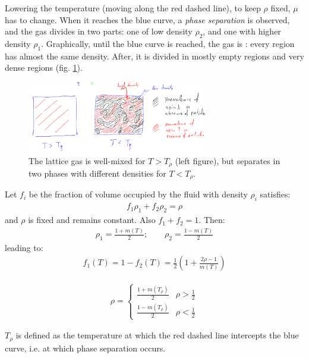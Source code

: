 \documentclass[../template.tex]{subfiles}
\begin{document}
Lowering the temperature (moving along the red dashed line), to keep $\rho$ fixed, $\mu$ has to change. When it reaches the blue curve, a \textit{phase separation} is observed, and the gas divides in two parts: one of low density $\rho_2$, and one with higher density $\rho_1$. Graphically, until the blue curve is reached, the gas is : every region has almost the same density. After, it is divided in mostly empty regions and very dense regions (fig. \ref{fig:fluid-sep}).

\begin{figure}[H]
    \centering
    \includegraphics[width=0.7\textwidth]{image022.png}
    \caption{The lattice gas is well-mixed for $T > T_\rho$ (left figure), but separates in two phases with different densities for $T < T_\rho$.\label{fig:fluid-sep}}
\end{figure}

Let $f_i$ be the fraction of volume occupied by the fluid with density $\rho_i$ satisfies:
\begin{align*}
    f_1 \rho_1 + f_2 \rho_2 = \rho
\end{align*}
and $\rho$ is fixed and remains constant. Also $f_1 + f_2 = 1$. Then:
\begin{align*}
    \rho_1 = \frac{1+m(T)}{2}; \qquad \rho_2 = \frac{1-m(T)}{2}  
\end{align*}
leading to:
\begin{align*}
    f_1(T) = 1-f_2(T) = \frac{1}{2} \left(1+\frac{2 \rho -1}{m(T)} \right) 
\end{align*}

\begin{align*}
    \rho = \begin{cases}
        \frac{1+m(T_\rho)}{2} & \rho > \frac{1}{2}\\
        \frac{1-m(T_\rho)}{2} & \rho < \frac{1}{2}    
    \end{cases}
\end{align*}

$T_\rho$ is defined as the temperature at which the red dashed line intercepts the blue curve, i.e. at which phase separation occurs. 
\end{document}
